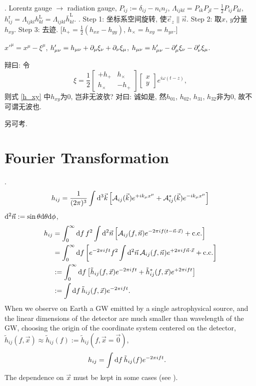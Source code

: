 \cite{Maggiore2014}. Lorentz gauge $\to$ radiation gauge, $P_{ij}:=\delta_{ij}-n_in_j$, $\Lambda_{ijkl}=P_{ik}P_{jl}-\frac{1}{2}P_{ij}P_{kl}$, $h_{ij}^\text{r}=\Lambda_{ijkl}h_{kl}^\text{L}=\Lambda_{ijkl}\bar{h}_{kl}^\text{L}$. \cite{Sathyaprakash2009}. Step 1: 坐标系空间旋转, 使$\vec{e}_z\parallel\vec{n}$. Step 2: 取$x$, $y$分量$h_{xy}$. Step 3: 去迹. [$h_+=\frac{1}{2}(h_{xx}-h_{yy})$, $h_\times=h_{xy}=h_{yx}$.]

$x'^\mu=x^\mu-\xi^\mu$, $h'_{\mu\nu}=h_{\mu\nu}+\partial_\mu\xi_\nu+\partial_\nu\xi_\mu$, $h_{\mu\nu}=h'_{\mu\nu}-\partial'_\mu\xi_\nu-\partial'_\nu\xi_\mu$.

辩曰: 令
\begin{equation}
    \xi=\frac{1}{2}\begin{bmatrix}
        +h_+&h_\times\\
        h_\times&-h_+
   \end{bmatrix}\begin{bmatrix}
    x\\y
    \end{bmatrix}e^{i\omega(t-z)},
\end{equation}
则式 \eqref{h_xy} 中$h_{xy}$为$0$, 岂非无波欤? 对曰: 诚如是, 然$h_{01}$, $h_{02}$, $h_{31}$, $h_{32}$非为$0$, 故不可谓无波也.

另可考\cite{Jaranowski2009}.

\section{Fourier Transformation}

\cite{Maggiore2014}. 
\begin{equation}
    h_{ij}=\frac{1}{(2\pi)^3}\int\mathrm{d}^3\vec{k}\left[\mathcal{A}_{ij}(\vec{k})e^{+ik_\mu x^\mu}+\mathcal{A}_{ij}^*(\vec{k})e^{-ik_\mu x^\mu}\right]
\end{equation}
$\mathrm{d}^2\vec{n}:=\sin\theta\mathrm{d}\theta\mathrm{d}\phi$,
\begin{align}
    h_{ij}&=\int_0^\infty\mathrm{d} f\, f^2\int\mathrm{d}^2\vec{n}\left[\mathcal{A}_{ij}(f,\vec{n})e^{-2\pi i f(t-\vec{n}\cdot\vec{x})}+\text{c.c.}\right]\\
    &=\int_0^\infty\mathrm{d} f\left[e^{-2\pi i ft}f^2\int\mathrm{d}^2\vec{n}\,\mathcal{A}_{ij}(f,\vec{n})e^{+2\pi i f\vec{n}\cdot\vec{x}}+\text{c.c.}\right]\\
    &:=\int_0^\infty\mathrm{d} f\left[\tilde{h}_{ij}(f,\vec{x})e^{-2\pi i ft}+\tilde{h}_{ij}^*(f,\vec{x})e^{+2\pi i ft}\right]\\
    &:=\int\mathrm{d} f\,\tilde{h}_{ij}(f,\vec{x})e^{-2\pi i ft}.
\end{align}
When we observe on Earth a GW emitted by a single astrophysical source, and the linear dimensions of the detector are much smaller than wavelength of the GW, choosing the origin of the coordinate system centered on the detector, $\tilde{h}_{ij}(f,\vec{x})\approx\tilde{h}_{ij}(f):=\tilde{h}_{ij}(f,\vec{x}=\vec{0})$,
\begin{align}
    h_{ij}&=\int\mathrm{d} f\,\tilde{h}_{ij}(f)e^{-2\pi i ft}.
\end{align}
The dependence on $\vec{x}$ must be kept in some cases (see \cite{Maggiore2014}).

